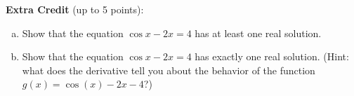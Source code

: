 \documentclass[11pt]{article}
\def\be{\begin{enumerate}}
\def\ee{\end{enumerate}}
\begin{document}
\begin{enumerate}
\newpage

{\bf Extra Credit} (up to 5 points):
\be[(a)]

\item Show that the equation $\cos x - 2x = 4$ has at least one real solution. 

\vfill

\item Show that the equation $\cos x - 2x = 4$ has exactly one real solution. (Hint: what does the derivative tell you about the behavior of the function $g(x) = \cos(x) - 2x - 4$?)

\vfill
\ee


\end{enumerate}
\end{document}
